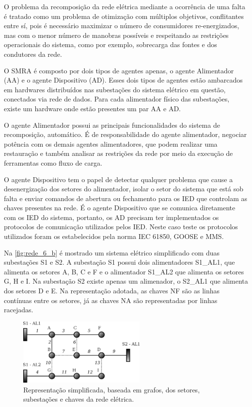 \documentclass[journal]{IEEEtran}
\begin{document}
O problema da recomposição da rede elétrica mediante a ocorrência de uma falta é tratado como um problema de otimização com múltiplos objetivos, conflitantes entre sí, pois é necessário maximizar o número de consumidores re-energizados, mas com o menor número de manobras possíveis e respeitando as restrições operacionais do sistema, como por exemplo, sobrecarga das fontes e dos condutores da rede.

O SMRA é composto por dois tipos de agentes apenas, o agente Alimentador (AA) e o agente Dispositivo (AD). Esses dois tipos de agentes estão ambarcados em hardwares distribuídos nas subestações do sistema elétrico em questão, conectados via rede de dados. Para cada alimentador físico das subestações, existe um hardware onde estão presentes um par AA e AD.

O agente Alimentador possui as principais funcionalidades do sistema de recomposição, automático. É de responsabilidade do agente alimentador, negociar potência com os demais agentes alimentadores, que podem realizar uma restauração e também analisar as restrições da rede por meio da execução de ferramentas como fluxo de carga.

O agente Dispositivo tem o papel de detectar qualquer problema que cause a desenergização dos setores do alimentador, isolar o setor do sistema que está sob falta e enviar comandos de abertura ou fechamento para os IED que controlam as chaves presentes na rede. É o agente Dispositivo que se comunica diretamente com os IED do sistema, portanto, os AD precisam ter implementados os protocolos de comunicação utilizados pelos IED. Neste caso teste os protocolos utilizados foram os estabelecidos pela norma IEC 61850, GOOSE e MMS.

Na \autoref{fig:rede_6_b} é mostrado um sistema elétrico simplificado com duas subestações S1 e S2. A subestação S1 possui dois alimentadores S1\_AL1, que alimenta os setores A, B, C e F e o alimentador S1\_AL2 que alimenta os setores G, H e I. Na subestação S2 existe apenas um alimenador, o S2\_AL1 que alimenta dos setores D e E. Na representação adotada, as chaves NF são as linhas contínuas entre os setores, já as chaves NA são representadas por linhas racejadas.

\begin{figure}[htb]
    \centering
    
    \includegraphics[width=2.5in]{Figuras/rede_estado_normal.eps}

    \caption{\label{fig:rede_6_b} Representação simplificada, baseada em grafos, dos setores, subestações e chaves da rede elétrica.}
\end{figure}
\end{document}
